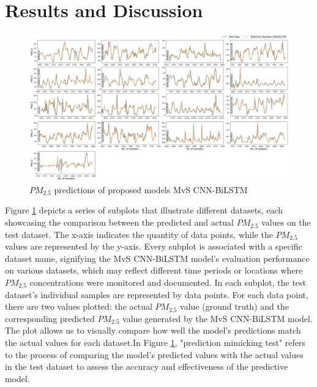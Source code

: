 \documentclass[a4paper,fleqn]{cas-sc}
\begin{document}
\section{Results and Discussion}


\begin{figure}[h!]
	\centering
		\includegraphics[scale=0.29]{img/act vs pri}
	  \caption{$PM_{2.5}$ predictions of proposed models MvS CNN-BiLSTM}\label{ACt_vs_Pred}
\end{figure}
Figure \ref{ACt_vs_Pred} depicts a series of subplots that illustrate different datasets, each showcasing the comparison between the predicted and actual $PM_{2.5}$ values on the test dataset. The x-axis indicates the quantity of data points, while the $PM_{2.5}$ values are represented by the y-axis. Every subplot is associated with a specific dataset name, signifying the MvS CNN-BiLSTM model's evaluation performance on various datasets, which may reflect different time periods or locations where $PM_{2.5}$ concentrations were monitored and documented. In each subplot, the test dataset's individual samples are represented by data points. For each data point, there are two values plotted: the actual $PM_{2.5}$ value (ground truth) and the corresponding predicted $PM_{2.5}$ value generated by the MvS CNN-BiLSTM model. The plot allows us to visually compare how well the model's predictions match the actual values for each dataset.In Figure \ref{ACt_vs_Pred}, "prediction mimicking test" refers to the process of comparing the model's predicted values with the actual values in the test dataset to assess the accuracy and effectiveness of the predictive model.
\end{document}
